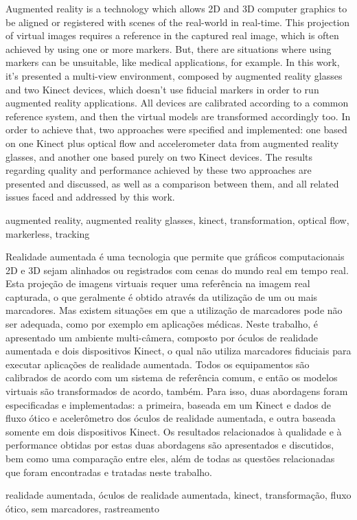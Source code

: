 \documentclass[msc, a4paper, classic, en]{ufbathesis}
\begin{document}
\abstract
Augmented reality is a technology which allows 2D and 3D computer graphics to be aligned or registered with scenes of the real-world in real-time. This projection of virtual images requires a reference in the captured real image, which is often achieved by using one or more markers. But, there are situations where using markers can be unsuitable, like medical applications, for example. In this work, it's presented a multi-view environment, composed by augmented reality glasses and two Kinect devices, which doesn't use fiducial markers in order to run augmented reality applications. All devices are calibrated according to a common reference system, and then the virtual models are transformed accordingly too. In order to achieve that, two approaches were specified and implemented: one based on one Kinect plus optical flow and accelerometer data from augmented reality glasses, and another one based purely on two Kinect devices. The results regarding quality and performance achieved by these two approaches are presented and discussed, as well as a comparison between them, and all related issues faced and addressed by this work.
\begin{keywords}
augmented reality, augmented reality glasses, kinect, transformation, optical flow, markerless, tracking
\end{keywords}

\resumo
Realidade aumentada é uma tecnologia que permite que gráficos computacionais 2D e 3D sejam alinhados ou registrados com cenas do mundo real em tempo real. Esta projeção de imagens virtuais requer uma referência na imagem real capturada, o que geralmente é obtido através da utilização de um ou mais marcadores. Mas existem situações em que a utilização de marcadores pode não ser adequada, como por exemplo em aplicações médicas. Neste trabalho, é apresentado um ambiente multi-câmera, composto por óculos de realidade aumentada e dois dispositivos Kinect, o qual não utiliza marcadores fiduciais para executar aplicações de realidade aumentada. Todos os equipamentos são calibrados de acordo com um sistema de referência comum, e então os modelos virtuais são transformados de acordo, também. Para isso, duas abordagens foram especificadas e implementadas: a primeira, baseada em um Kinect e dados de fluxo ótico e acelerômetro dos óculos de realidade aumentada, e outra baseada somente em dois dispositivos Kinect. Os resultados relacionados à qualidade e à performance obtidas por estas duas abordagens são apresentados e discutidos, bem como uma comparação entre eles, além de todas as questões relacionadas que foram encontradas e tratadas neste trabalho.
\begin{keywords}
realidade aumentada, óculos de realidade aumentada, kinect, transformação, fluxo ótico, sem marcadores, rastreamento
\end{keywords}
\end{document}
